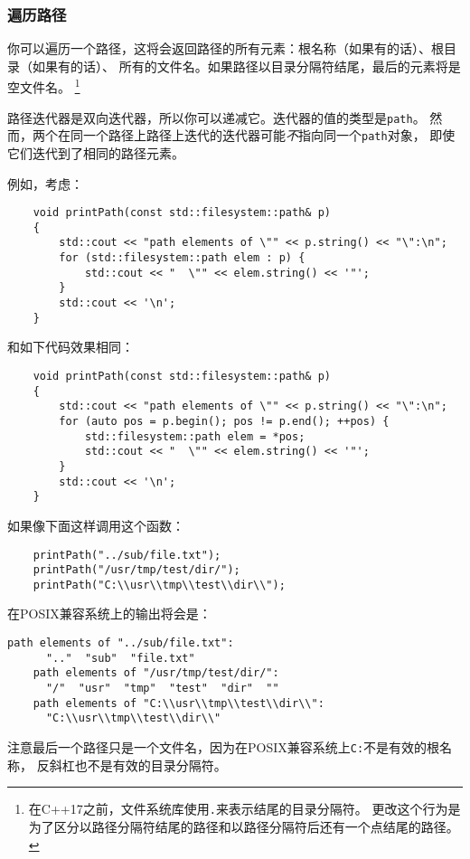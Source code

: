 \subsubsection{遍历路径}
你可以遍历一个路径，这将会返回路径的所有元素：根名称（如果有的话）、根目录（如果有的话）、
所有的文件名。如果路径以目录分隔符结尾，最后的元素将是空文件名。
\footnote{在C++17之前，文件系统库使用\texttt{.}来表示结尾的目录分隔符。
更改这个行为是为了区分以路径分隔符结尾的路径和以路径分隔符后还有一个点结尾的路径。}

路径迭代器是双向迭代器，所以你可以递减它。迭代器的值的类型是\texttt{path}。
然而，两个在同一个路径上路径上迭代的迭代器可能\emph{不}指向同一个\texttt{path}对象，
即使它们迭代到了相同的路径元素。

例如，考虑：
\begin{lstlisting}
    void printPath(const std::filesystem::path& p)
    {
        std::cout << "path elements of \"" << p.string() << "\":\n";
        for (std::filesystem::path elem : p) {
            std::cout << "  \"" << elem.string() << '"';
        }
        std::cout << '\n';
    }
\end{lstlisting}
和如下代码效果相同：
\begin{lstlisting}
    void printPath(const std::filesystem::path& p)
    {
        std::cout << "path elements of \"" << p.string() << "\":\n";
        for (auto pos = p.begin(); pos != p.end(); ++pos) {
            std::filesystem::path elem = *pos;
            std::cout << "  \"" << elem.string() << '"';
        }
        std::cout << '\n';
    }
\end{lstlisting}
如果像下面这样调用这个函数：
\begin{lstlisting}
    printPath("../sub/file.txt");
    printPath("/usr/tmp/test/dir/");
    printPath("C:\\usr\\tmp\\test\\dir\\");
\end{lstlisting}
在POSIX兼容系统上的输出将会是：
\begin{lstlisting}[stringstyle=\color{black}]
    path elements of "../sub/file.txt":
      ".."  "sub"  "file.txt"
    path elements of "/usr/tmp/test/dir/":
      "/"  "usr"  "tmp"  "test"  "dir"  ""
    path elements of "C:\\usr\\tmp\\test\\dir\\":
      "C:\\usr\\tmp\\test\\dir\\"
\end{lstlisting}
注意最后一个路径只是一个文件名，因为在POSIX兼容系统上\texttt{C:}不是有效的根名称，
反斜杠也不是有效的目录分隔符。

